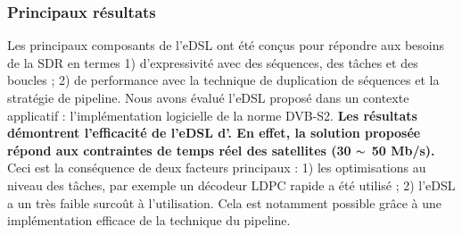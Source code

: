 \subsubsection*{Principaux résultats}

Les principaux composants de l'eDSL ont été conçus pour répondre aux besoins de
la SDR en termes 1) d'expressivité avec des séquences, des tâches et des
boucles ; 2) de performance avec la technique de duplication de séquences et la
stratégie de pipeline. Nous avons évalué l'eDSL proposé dans un contexte
applicatif : l'implémentation logicielle de la norme DVB-S2. \textbf{Les
résultats démontrent l'efficacité de l'eDSL d'\AFFECT. En effet, la solution
proposée répond aux contraintes de temps réel des satellites (30 $\thicksim$
50 Mb/s).} Ceci est la conséquence de deux facteurs principaux : 1) les
optimisations au niveau des tâches, par exemple un décodeur LDPC rapide a été
utilisé ; 2) l'eDSL a un très faible surcoût à l'utilisation. Cela est notamment
possible grâce à une implémentation efficace de la technique du pipeline.
